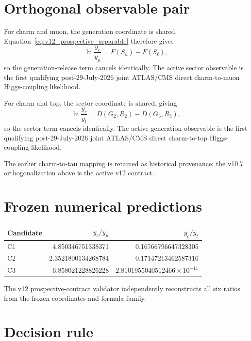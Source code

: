 \section{Orthogonal observable pair}

For charm and muon, the generation coordinate is shared. Equation~\eqref{eq:v12_prospective_separable} therefore gives
\begin{equation}
\boxed{
\ln\frac{y_c}{y_\mu}=F(S_u)-F(S_\ell),
}
\label{eq:v12_yc_ymu}
\end{equation}
so the generation-release term cancels identically. The active sector observable is the first qualifying post-29-July-2026 joint ATLAS/CMS direct charm-to-muon Higgs-coupling likelihood.

For charm and top, the sector coordinate is shared, giving
\begin{equation}
\boxed{
\ln\frac{y_c}{y_t}
=D(G_2,R_2)-D(G_3,R_3),
}
\label{eq:v12_yc_yt}
\end{equation}
so the sector term cancels identically. The active generation observable is the first qualifying post-29-July-2026 joint ATLAS/CMS direct charm-to-top Higgs-coupling likelihood.

The earlier charm-to-tau mapping is retained as historical provenance; the v10.7 orthogonalization above is the active v12 contract.

\section{Frozen numerical predictions}

\begin{center}
\begin{tabular}{lrr}
\toprule
Candidate & $y_c/y_\mu$ & $y_c/y_t$\\
\midrule
C1 & 4.850346751338371 & 0.16766796647328305\\
C2 & 2.3521800134268784 & 0.17147213462587316\\
C3 & 6.858021228826228 & $2.8101955040512466\times10^{-11}$\\
\bottomrule
\end{tabular}
\end{center}

The v12 prospective-contract validator independently reconstructs all six ratios from the frozen coordinates and formula family.

\section{Decision rule}

